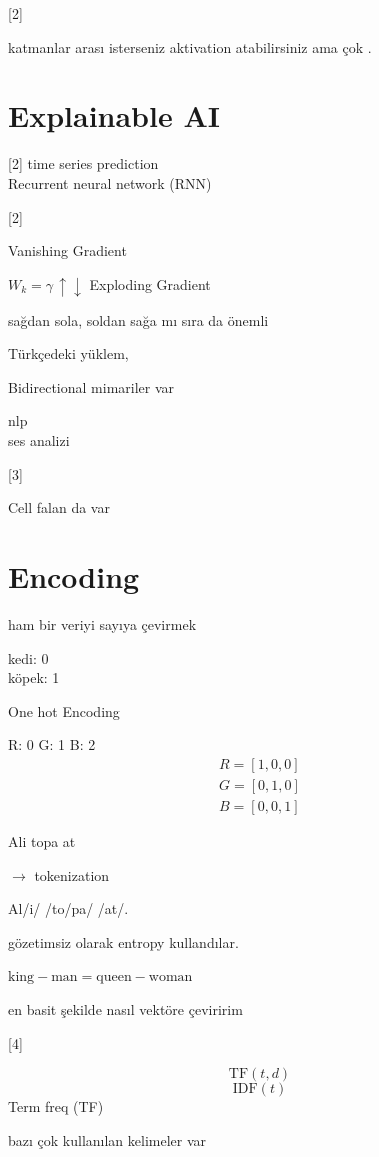 \documentclass[11pt,a4paper]{article}
\begin{document}
[2]

katmanlar arası isterseniz aktivation atabilirsiniz ama çok .

\section{Explainable AI}
[2]
time series prediction\\
Recurrent neural network (RNN)

[2]

Vanishing Gradient

$W_k = \gamma\,\uparrow\downarrow$ \okunamadi{} \quad Exploding Gradient

sağdan sola, soldan sağa mı sıra da önemli

Türkçedeki yüklem,

Bidirectional mimariler var

nlp\\
ses analizi

[3]

Cell falan da var

\section{Encoding}
ham bir veriyi sayıya çevirmek

kedi: 0\\
köpek: 1

One hot Encoding

R: 0 \quad G: 1 \quad B: 2
\begin{gather*}
R=[1,0,0]\\
G=[0,1,0]\\
B=[0,0,1]
\end{gather*}

Ali topa at

$\rightarrow$ tokenization

Al/i/ /to/pa/ /at/.

gözetimsiz olarak entropy kullandılar.

$\text{king}-\text{man} = \text{queen}-\text{woman}$

en basit şekilde nasıl vektöre çeviririm

[4]

\[ \mathrm{TF}(t,d) \]
\[ \mathrm{IDF}(t) \]
Term freq (TF)

bazı çok kullanılan kelimeler var
\end{document}
